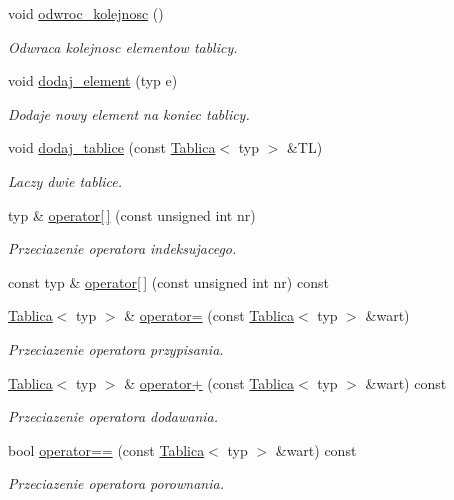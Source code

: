 \begin{DoxyCompactItemize}
void \hyperlink{class_tablica_a0f9fd0bf340493601f668810d0ca1e30}{odwroc\-\_\-kolejnosc} ()
\begin{DoxyCompactList}\small\item\em Odwraca kolejnosc elementow tablicy. \end{DoxyCompactList}\item 
void \hyperlink{class_tablica_a42308f822df1d0ce7fe52bb6fb0b3136}{dodaj\-\_\-element} (typ e)
\begin{DoxyCompactList}\small\item\em Dodaje nowy element na koniec tablicy. \end{DoxyCompactList}\item 
void \hyperlink{class_tablica_ab1cb35073b5efda1f26d0ea31b0e4904}{dodaj\-\_\-tablice} (const \hyperlink{class_tablica}{Tablica}$<$ typ $>$ \&T\-L)
\begin{DoxyCompactList}\small\item\em Laczy dwie tablice. \end{DoxyCompactList}\item 
typ \& \hyperlink{class_tablica_ab67121d4fa7844e0d55f3c8618c1b892}{operator\mbox{[}$\,$\mbox{]}} (const unsigned int nr)
\begin{DoxyCompactList}\small\item\em Przeciazenie operatora indeksujacego. \end{DoxyCompactList}\item 
const typ \& \hyperlink{class_tablica_a99fb79fd510251033fd50a9b088ce8d7}{operator\mbox{[}$\,$\mbox{]}} (const unsigned int nr) const 
\item 
\hyperlink{class_tablica}{Tablica}$<$ typ $>$ \& \hyperlink{class_tablica_a14a8ec8c5c0c69075f4dbf806ae16cd8}{operator=} (const \hyperlink{class_tablica}{Tablica}$<$ typ $>$ \&wart)
\begin{DoxyCompactList}\small\item\em Przeciazenie operatora przypisania. \end{DoxyCompactList}\item 
\hyperlink{class_tablica}{Tablica}$<$ typ $>$ \& \hyperlink{class_tablica_a5c50ac848aef021f437a2c9f731cd3ec}{operator+} (const \hyperlink{class_tablica}{Tablica}$<$ typ $>$ \&wart) const 
\begin{DoxyCompactList}\small\item\em Przeciazenie operatora dodawania. \end{DoxyCompactList}\item 
bool \hyperlink{class_tablica_ae658ff24fdb60ea11f03460f9d697e73}{operator==} (const \hyperlink{class_tablica}{Tablica}$<$ typ $>$ \&wart) const 
\begin{DoxyCompactList}\small\item\em Przeciazenie operatora porownania. \end{DoxyCompactList}\end{DoxyCompactItemize}
